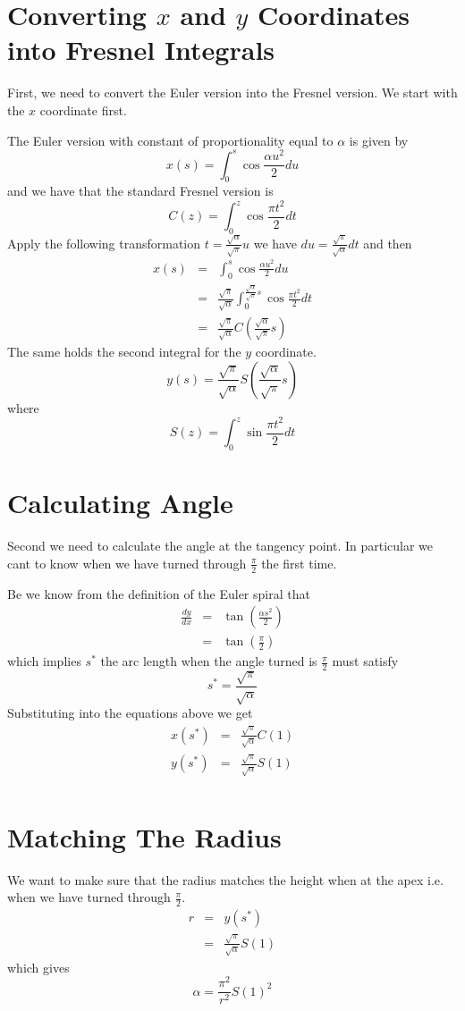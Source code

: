 \documentclass[]{article} %
\begin{document}
\section{Converting $x$ and $y$ Coordinates into Fresnel Integrals}
First, we need to convert the Euler version into the Fresnel version.  We start with the $x$ coordinate first.

The Euler version with constant of proportionality equal to $\alpha$ is given by
\[
	x(s) = \int_{0}^{s} \cos \frac{\alpha u^2}{2} du
\]
and we have that the standard Fresnel version is 
\[
	C(z) = \int_{0}^{z} \cos \frac{\pi t^2}{2} dt
\]
Apply the following transformation $t = \frac{\sqrt{\alpha}}{\sqrt{\pi}} u$ we have $du = \frac{\sqrt{\pi}}{\sqrt{\alpha}} dt$ and then
\begin{eqnarray*}
	x(s) &=& \int_{0}^{s} \cos \frac{\alpha u^2}{2} du \\
	     &=& \frac{\sqrt{\pi}}{\sqrt{\alpha}} \int_{0}^{\frac{\sqrt{\alpha}}{\sqrt{\pi}} s} \cos \frac{\pi t^2}{2} dt \\
	     &=& \frac{\sqrt{\pi}}{\sqrt{\alpha}} C\left(\frac{\sqrt{\alpha}}{\sqrt{\pi}} s\right)
\end{eqnarray*}
The same holds the second integral for the $y$ coordinate.
\[
	y(s) = \frac{\sqrt{\pi}}{\sqrt{\alpha}} S\left(\frac{\sqrt{\alpha}}{\sqrt{\pi}} s\right)
\]
where 
\[
	S(z) = \int_{0}^{z} \sin \frac{\pi t^2}{2} dt
\]

\section{Calculating Angle}
Second we need to calculate the angle at the tangency point. In particular we cant to know when we have turned through $\frac{\pi}{2}$ the first time.

Be we know from the definition of the Euler spiral that 
\begin{eqnarray*}
	\frac{dy}{dx} &=& \tan \left( \frac{\alpha s^2}{2}\right) \\
				  &=& \tan \left( \frac{\pi}{2}\right)
\end{eqnarray*}
which implies $s^*$ the arc length when the angle turned is $\frac{\pi}{2}$ must satisfy 
\[
	s^* = \frac{\sqrt{\pi}}{\sqrt{\alpha}}
\]
Substituting into the equations above we get
\begin{eqnarray*}
x(s^*) &=& \frac{\sqrt{\pi}}{\sqrt{\alpha}} C\left( 1 \right) \\
y(s^*) &=& \frac{\sqrt{\pi}}{\sqrt{\alpha}} S\left( 1 \right) \\
\end{eqnarray*}

\section{Matching The Radius}
We want to make sure that the radius matches the height when at the apex i.e. when we have turned through $\frac{\pi}{2}$.
\begin{eqnarray*}
	r &=& y(s^*) \\ 
	  &=& \frac{\sqrt{\pi}}{\sqrt{\alpha}} S\left( 1 \right)
\end{eqnarray*}
which gives
\[
	\alpha = \frac{\pi^2}{r^2} S(1) ^2
\]
\end{document}
